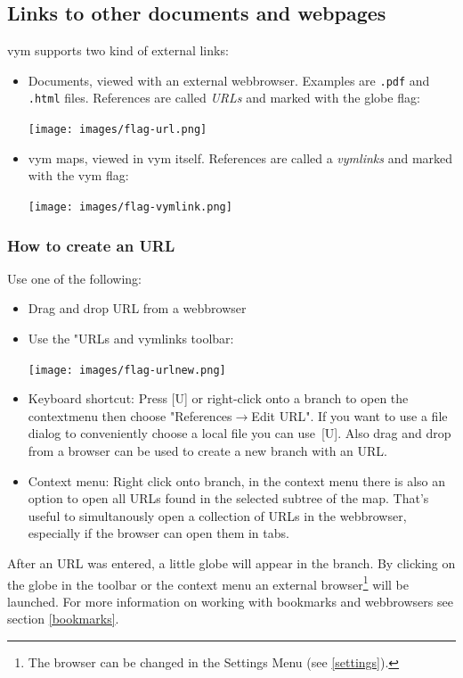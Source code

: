 \documentclass[12pt,a4paper]{article}
\newcommand{\vym}{{\sc vym }}
\newcommand{\ra}{$\longrightarrow$}
\newcommand{\key}[1]{[#1]}
\begin{document}
\subsection{Links to other documents and webpages}
\vym supports two kind of external links:
\begin{itemize}
    \item Documents, viewed with an external webbrowser.
    Examples are {\tt .pdf} and {\tt .html} files. References 
    are called {\em URLs} and marked with the globe
    flag:
    \begin{center}
	\texttt{[image: images/flag-url.png]}
    \end{center}

    \item \vym maps, viewed in \vym itself. References are called
    a {\em vymlinks} and marked with the \vym flag:
    \begin{center}
	\texttt{[image: images/flag-vymlink.png]}
    \end{center}
\end{itemize}

\subsubsection{How to create an URL} 
Use one of the following:
\begin{itemize}
\item{Drag and drop URL from a webbrowser}
\item{Use the "URLs and vymlinks toolbar:}
    \begin{center}
	\texttt{[image: images/flag-urlnew.png]}
    \end{center}
\item{Keyboard shortcut:}
    Press \key{U} or right-click  onto a
    branch to open the contextmenu then choose "References\ra Edit URL". If
    you want to use a file dialog to conveniently choose a local file you
    can use~\key{U}. Also drag and drop from a browser can be used to create
    a new branch with an URL.
\item{Context menu:} 
    Right click onto branch,
    in the context menu there is also an option to open all URLs found
    in the selected subtree of the map. That's useful to simultanously open
    a collection of URLs in the webbrowser, especially if the browser can
    open them in tabs.

\end{itemize}

After an URL was entered, a little globe will appear in the branch. By
clicking on the globe in the toolbar or the context menu an external
browser\footnote{
    The browser can be changed in the Settings Menu (see \ref{settings}).}
will be launched.
For more information on working with bookmarks and webbrowsers see
section \ref{bookmarks}.
\end{document}
